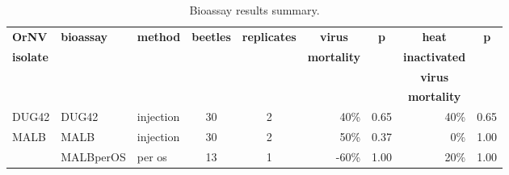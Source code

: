 \documentclass[12pt,letterpaper,english,bibliography=totocnumbered]{scrartcl}
\begin{document}
\begin{table}[h]
	\caption{Bioassay results summary.}
	\begin{adjustbox}{width=\columnwidth,center}
			
	\begin{tabular}{ l l l c c r r r r }
		\toprule
		\textbf{OrNV}             & \textbf{bioassay}                               & \textbf{method\tnote{1}} & \textbf{beetles} & \textbf{replicates} & \multicolumn{1}{c}{\textbf{virus}}     & \multicolumn{1}{c}{\textbf{p}} & \multicolumn{1}{c}{\textbf{\textbf{heat}}} & \multicolumn{1}{c}{\textbf{p}} \\
		\textbf{\textbf{isolate}} &                                                 &                 &                  &                     & \multicolumn{1}{c}{\textbf{mortality}} &                                & \multicolumn{1}{c}{\textbf{inactivated}}   &  \\
		                          &                                                 &                 &                  &                     &                                        &                                & \multicolumn{1}{c}{\textbf{virus}}         &  \\
		                          &                                                 &                 &                  &                     &                                        &                                & \multicolumn{1}{c}{\textbf{mortality}}     &  \\ \midrule
		DUG42                     & DUG42\cite{moore_bioassay_2019}                 & injection       & 30               & 2                   & 40\%                                   & 0.65                           & 40\%                                       & 0.65                           \\ \midrule
		\multirow{2}{*}{MALB}     & MALB\cite{moore_bioassay_2019-6}                & injection       & 30               & 2                   & 50\%                                   & 0.37                           & 0\%                                        & 1.00                           \\
		                          & MALBperOS\cite{moore_bioassay_2019-7}           & per os          & 13               & 1                   & -60\%                                  & 1.00                           & 20\%                                       & 1.00                           \\ \midrule

\end{tabular}
\end{adjustbox}
\end{table}
\end{document}
